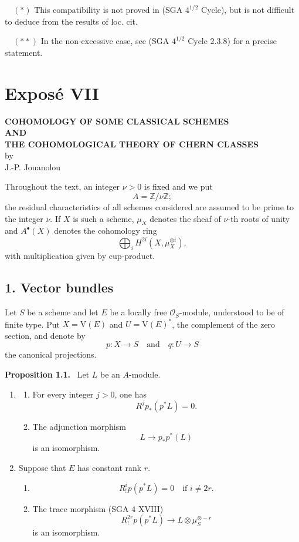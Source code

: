 \documentclass[11pt]{article}
\newenvironment{statement}[1]{\par\medskip\noindent\textbf{#1.}\ }{\par\medskip}
\providecommand{\V}{\mathrm V}
\begin{document}
\begin{flushleft}
\(\quad (*)\) This compatibility is not proved in (SGA \(4^{1/2}\) Cycle), but is not difficult to deduce from the results of loc. cit.

\(\quad (**)\) In the non-excessive case, see (SGA \(4^{1/2}\) Cycle 2.3.8) for a precise statement.
\end{flushleft}


\section*{Exposé VII}

\begin{center}
\textbf{COHOMOLOGY OF SOME CLASSICAL SCHEMES}\\[0.5em]
\textbf{AND}\\[0.5em]
\textbf{THE COHOMOLOGICAL THEORY OF CHERN CLASSES}\\[1em]
by\\[0.5em]
J.-P. Jouanolou
\end{center}

Throughout the text, an integer $\nu>0$ is fixed and we put
\[
A=\mathbb Z/\nu\mathbb Z;
\]
the residual characteristics of all schemes considered are assumed to be prime to the integer $\nu$. If $X$ is such a scheme, $\mu_X$ denotes the sheaf of $\nu$-th roots of unity and $A^{\bullet}(X)$ denotes the cohomology ring
\[
\bigoplus_i H^{2i}(X,\mu_X^{\otimes i}),
\]
with multiplication given by cup-product.

\subsection*{1. Vector bundles}

Let $S$ be a scheme and let $E$ be a locally free $\mathcal O_S$-module, understood to be of finite type. Put $X=\V(E)$ and $U=\V(E)^*$, the complement of the zero section, and denote by
\[
p:X\to S
\quad\text{and}\quad
q:U\to S
\]
the canonical projections.

\begin{statement}{Proposition 1.1}
Let $L$ be an $A$-module.
\begin{enumerate}[label=(\roman*)]
\item
\begin{enumerate}[label=\alph*)]
\item For every integer $j>0$, one has
\[
R^j p_*(p^*L)=0.
\]
\item The adjunction morphism
\[
L\longrightarrow p_*p^*(L)
\]
is an isomorphism.
\end{enumerate}
\item Suppose that $E$ has constant rank $r$.
\begin{enumerate}[label=\alph*)]
\item
\[
R_!^i p(p^*L)=0\quad\text{if }i\ne 2r.
\]
\item The trace morphism (SGA 4 XVIII)
\[
R_!^{2r}p(p^*L)\longrightarrow L\otimes\mu_S^{\otimes -r}
\]
is an isomorphism.
\end{enumerate}
\end{enumerate}
\end{statement}
\end{document}
